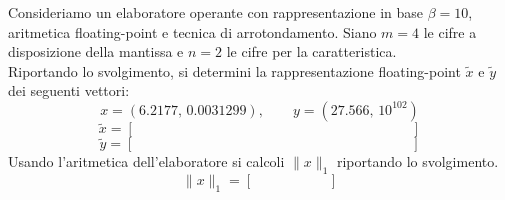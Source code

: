 Consideriamo un elaboratore operante con rappresentazione in base 
$\beta=10$, aritmetica floating-point e tecnica di 
arrotondamento. Siano $m=4$ le cifre a disposizione
della mantissa e $n=2$ le cifre per la caratteristica.\\
\noindent Riportando lo svolgimento, si determini la 
rappresentazione floating-point $\widetilde{x}$ e $\widetilde{y}$ 
dei seguenti vettori:
\[ x=(6.2177,\,  0.0031299), \quad \quad  y=(27.566, \, 10^{102}) \]
\vspace*{5cm}
\[ 
\widetilde{x}=\left [
\begin{array}{cccccccccccccc}
\quad &  \quad & \quad &  \quad & \quad & \quad & \quad & \quad  & \quad  & \quad & \quad     \\
\quad &  \quad & \quad &  \quad  & \quad  & \quad & \quad & \quad 
& \quad & \quad & \quad
\end{array}\right]
\]
\medskip
\[
\widetilde{y}=\left [
\begin{array}{cccccccccccccc}
\quad &  \quad & \quad &  \quad & \quad & \quad & \quad & \quad & \quad  & \quad  & \quad   \\
\quad &  \quad & \quad &  \quad  & \quad  & \quad & \quad & \quad 
& \quad & \quad & \quad
\end{array}\right]
\]
\noindent
Usando l'aritmetica dell'elaboratore si calcoli $\|x\|_1$ 
riportando lo svolgimento.
\vspace*{3cm}
\[ 
\|x\|_1=\left [
\begin{array}{ccc}
\quad &  \quad & \quad \\
\quad &  \quad & \quad
\end{array}\right]
\]
